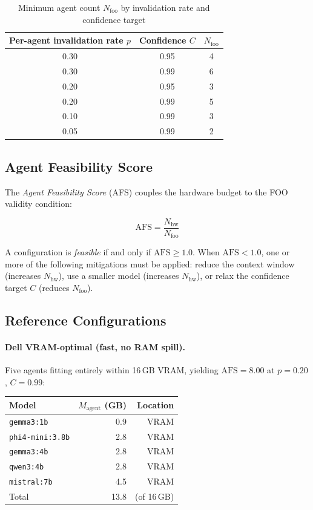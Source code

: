 \begin{table}[h]
\centering
\caption{Minimum agent count $N_{\text{foo}}$ by invalidation rate and
confidence target}
\label{tab:nfoo}
\begin{tabular}{ccc}
\toprule
Per-agent invalidation rate $p$ & Confidence $C$ & $N_{\text{foo}}$ \\
\midrule
0.30 & 0.95 & 4 \\
0.30 & 0.99 & 6 \\
0.20 & 0.95 & 3 \\
0.20 & 0.99 & 5 \\
0.10 & 0.99 & 3 \\
0.05 & 0.99 & 2 \\
\bottomrule
\end{tabular}
\end{table}

\subsection{Agent Feasibility Score}

The \emph{Agent Feasibility Score} (AFS) couples the hardware budget to
the FOO validity condition:

\begin{equation}
\text{AFS} = \frac{N_{\text{hw}}}{N_{\text{foo}}}
\label{eq:afs}
\end{equation}

A configuration is \emph{feasible} if and only if $\text{AFS} \geq 1.0$.
When $\text{AFS} < 1.0$, one or more of the following mitigations must
be applied: reduce the context window (increases $N_{\text{hw}}$), use a
smaller model (increases $N_{\text{hw}}$), or relax the confidence target
$C$ (reduces $N_{\text{foo}}$).

\subsection{Reference Configurations}

\paragraph{Dell VRAM-optimal (fast, no RAM spill).}
Five agents fitting entirely within 16\,GB VRAM, yielding
$\text{AFS} = 8.00$ at $p = 0.20$, $C = 0.99$:

\begin{center}
\begin{tabular}{lrr}
\toprule
Model & $M_{\text{agent}}$ (GB) & Location \\
\midrule
\texttt{gemma3:1b}    & 0.9 & VRAM \\
\texttt{phi4-mini:3.8b} & 2.8 & VRAM \\
\texttt{gemma3:4b}    & 2.8 & VRAM \\
\texttt{qwen3:4b}     & 2.8 & VRAM \\
\texttt{mistral:7b}   & 4.5 & VRAM \\
\midrule
Total & 13.8 & (of 16\,GB) \\
\bottomrule
\end{tabular}
\end{center}

